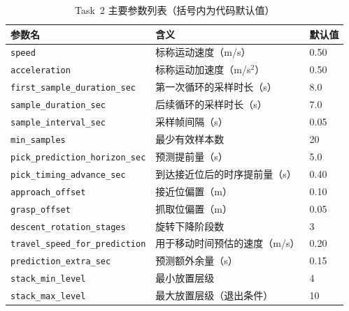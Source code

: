 \documentclass[12pt,a4paper]{article}
\begin{document}
\begin{table}[H]
  \centering
  \caption{Task~2 主要参数列表（括号内为代码默认值）}
  \label{tab:task2_params}
  \small
  \begin{tabularx}{\textwidth}{lXl}
    \toprule
    \textbf{参数名} & \textbf{含义} & \textbf{默认值} \\
    \midrule
    \texttt{speed}                        & 标称运动速度（m/s）                   & 0.50  \\
    \texttt{acceleration}                 & 标称运动加速度（m/s$^2$）             & 0.50  \\
    \texttt{first\_sample\_duration\_sec} & 第一次循环的采样时长（s）             & 8.0   \\
    \texttt{sample\_duration\_sec}        & 后续循环的采样时长（s）               & 7.0   \\
    \texttt{sample\_interval\_sec}        & 采样帧间隔（s）                       & 0.05  \\
    \texttt{min\_samples}                 & 最少有效样本数                        & 20    \\
    \texttt{pick\_prediction\_horizon\_sec} & 预测提前量（s）                     & 5.0   \\
    \texttt{pick\_timing\_advance\_sec}   & 到达接近位后的时序提前量（s）         & 0.40  \\
    \texttt{approach\_offset}             & 接近位偏置（m）                       & 0.10  \\
    \texttt{grasp\_offset}                & 抓取位偏置（m）                       & 0.05  \\
    \texttt{descent\_rotation\_stages}    & 旋转下降阶段数                        & 3     \\
    \texttt{travel\_speed\_for\_prediction} & 用于移动时间预估的速度（m/s）       & 0.20  \\
    \texttt{prediction\_extra\_sec}       & 预测额外余量（s）                     & 0.15  \\
    \texttt{stack\_min\_level}            & 最小放置层级                          & 4     \\
    \texttt{stack\_max\_level}            & 最大放置层级（退出条件）              & 10    \\
    \bottomrule
  \end{tabularx}
\end{table}

\end{document}
